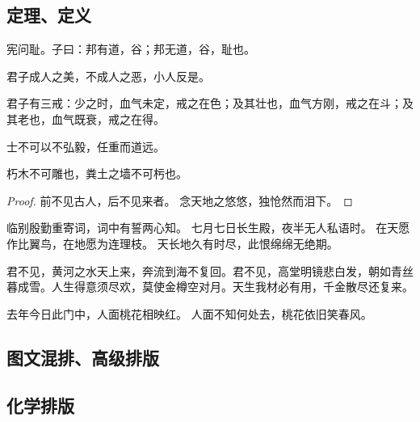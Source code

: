 \documentclass[%
               amsthm,
              ]{xjtubsc}
\begin{document}
\subsection{定理、定义}
\begin{theorem}
宪问耻。子曰：邦有道，谷；邦无道，谷，耻也。
\end{theorem}

\begin{axiom} [论语]
君子成人之美，不成人之恶，小人反是。
\end{axiom}

\begin{definition}
君子有三戒：少之时，血气未定，戒之在色；及其壮也，血气方刚，戒之在斗；及其老也，血气既衰，戒之在得。
\end{definition}

\begin{proposition}
士不可以不弘毅，任重而道远。
\end{proposition}

\begin{lemma}
朽木不可雕也，粪土之墙不可杇也。
\end{lemma}

\begin{proof}
前不见古人，后不见来者。 
念天地之悠悠，独怆然而泪下。 
\end{proof}


\begin{assumption}
临别殷勤重寄词，词中有誓两心知。 七月七日长生殿，夜半无人私语时。 在天愿作比翼鸟，在地愿为连理枝。 天长地久有时尽，此恨绵绵无绝期。
\end{assumption}

\begin{problem}
君不见，黄河之水天上来，奔流到海不复回。君不见，高堂明镜悲白发，朝如青丝暮成雪。人生得意须尽欢，莫使金樽空对月。天生我材必有用，千金散尽还复来。
\end{problem}

\begin{conjecture}[题都城南庄]
去年今日此门中，人面桃花相映红。 人面不知何处去，桃花依旧笑春风。 
\end{conjecture}

\subsection{图文混排、高级排版}

\subsection{化学排版}
\end{document}
